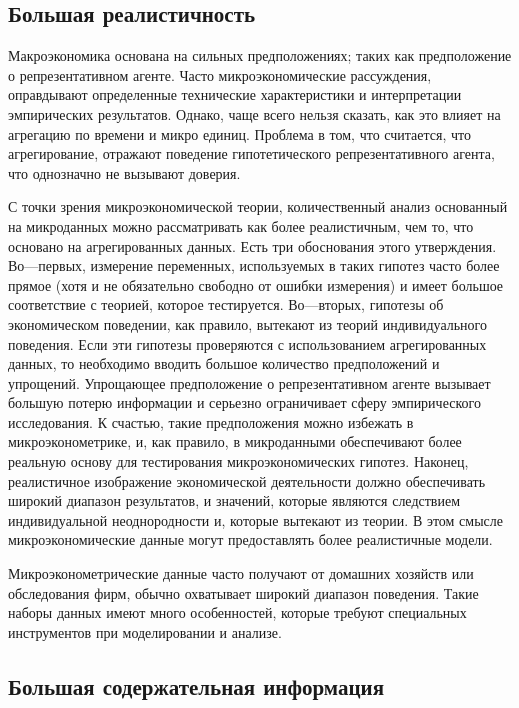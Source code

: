 \subsection{Большая реалистичность}

	Макроэкономика основана на сильных предположениях; таких как предположение о репрезентативном агенте. Часто микроэкономические рассуждения, оправдывают определенные технические характеристики и интерпретации эмпирических результатов. Однако, чаще всего нельзя сказать, как это влияет на агрегацию по времени и микро единиц. Проблема в том, что считается, что агрегирование, отражают поведение гипотетического репрезентативного агента, что однозначно не вызывают доверия.
	
	
	С точки зрения микроэкономической теории, количественный анализ основанный на микроданных можно рассматривать как более реалистичным, чем то, что основано на агрегированных данных. Есть три обоснования этого утверждения. Во---первых, измерение переменных, используемых в таких гипотез часто более прямое (хотя и не обязательно свободно от ошибки измерения) и имеет большое соответствие с теорией, которое тестируется. Во---вторых, гипотезы об экономическом поведении, как правило, вытекают из теорий индивидуального поведения. Если эти гипотезы проверяются с использованием агрегированных данных, то необходимо вводить большое количество предположений и упрощений. Упрощающее предположение о репрезентативном агенте вызывает большую потерю информации и серьезно ограничивает сферу эмпирического исследования. К счастью, такие предположения можно избежать в микроэконометрике, и, как правило, в  микроданными обеспечивают более реальную основу для тестирования микроэкономических гипотез. Наконец, реалистичное изображение экономической деятельности должно обеспечивать широкий диапазон результатов, и значений, которые являются следствием индивидуальной неоднородности и, которые вытекают из теории. В этом смысле микроэкономические данные могут предоставлять более реалистичные модели.
	
	
	Микроэконометрические данные часто получают от домашних хозяйств или обследования фирм, обычно охватывает широкий диапазон поведения. Такие наборы данных имеют много особенностей, которые требуют специальных инструментов при моделировании и анализе.

\subsection{Большая содержательная информация}

